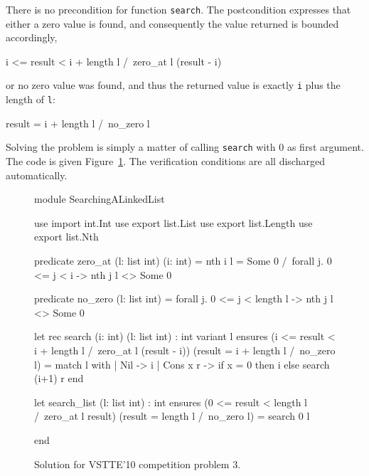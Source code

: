 There is no precondition for function \texttt{search}.
The postcondition expresses that either a zero value is found, and
consequently the value returned is bounded accordingly,
\begin{whycode}
  i <= result < i + length l /\ zero_at l (result - i)
\end{whycode}
or no zero value was found, and thus the returned value is exactly
\texttt{i} plus the length of \texttt{l}:
\begin{whycode}
  result = i + length l /\ no_zero l
\end{whycode}
Solving the problem is simply a matter of calling \texttt{search} with
0 as first argument.
The code is given Figure~\ref{fig:LinkedList}.
The verification conditions are all discharged automatically.
\begin{figure}
  \centering
\begin{whycode}
module SearchingALinkedList

  use import int.Int
  use export list.List
  use export list.Length
  use export list.Nth

  predicate zero_at (l: list int) (i: int) =
    nth i l = Some 0 /\ forall j. 0 <= j < i -> nth j l <> Some 0

  predicate no_zero (l: list int) =
    forall j. 0 <= j < length l -> nth j l <> Some 0

  let rec search (i: int) (l: list int) : int variant { l }
    ensures { (i <= result < i + length l /\ zero_at l (result - i))
           \/ (result = i + length l /\ no_zero l) }
  = match l with
    | Nil -> i
    | Cons x r -> if x = 0 then i else search (i+1) r
    end

  let search_list (l: list int) : int
    ensures { (0 <= result < length l /\ zero_at l result)
           \/ (result = length l /\ no_zero l) }
  = search 0 l

end
\end{whycode}
\vspace*{-1em}%
  \caption{Solution for VSTTE'10 competition problem 3.}
  \label{fig:LinkedList}
\end{figure}

